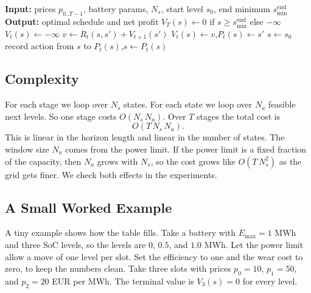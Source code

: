 \documentclass[conference,a4paper]{IEEEtran}
\begin{document}
\begin{algorithm}[t]
\caption{Battery arbitrage by dynamic programming}
\label{alg:dp}
\begin{algorithmic}[1]
\State \textbf{Input:} prices $p_{0..T-1}$, battery params, $N_s$,
start level $s_0$, end minimum $s_{\min}^{\text{end}}$
\State \textbf{Output:} optimal schedule and net profit
  \State $V_T(s) \gets 0$ if $s \ge s_{\min}^{\text{end}}$ else $-\infty$
\EndFor
{}
    \State $V_t(s) \gets -\infty$
      \State $v \gets R_t(s,s') + V_{t+1}(s')$
        \State $V_t(s) \gets v$,\quad $P_t(s) \gets s'$
      \EndIf
    \EndFor
  \EndFor
\EndFor
\State $s \gets s_0$
  \State record action from $s$ to $P_t(s)$,\quad $s \gets P_t(s)$
\EndFor
\end{algorithmic}
\end{algorithm}

\subsection{Complexity}
For each stage we loop over $N_s$ states. For each state we loop over $N_a$
feasible next levels. So one stage costs $O(N_s\,N_a)$. Over $T$ stages the
total cost is
\begin{equation}
O(T\,N_s\,N_a).
\end{equation}
This is linear in the horizon length and linear in the number of states. The
window size $N_a$ comes from the power limit. If the power limit is a fixed
fraction of the capacity, then $N_a$ grows with $N_s$, so the cost grows like
$O(T\,N_s^2)$ as the grid gets finer. We check both effects in the
experiments.

\subsection{A Small Worked Example}
A tiny example shows how the table fills. Take a battery with $E_{\max}=1$ MWh
and three SoC levels, so the levels are $0$, $0.5$, and $1.0$ MWh. Let the
power limit allow a move of one level per slot. Set the efficiency to one and
the wear cost to zero, to keep the numbers clean. Take three slots with prices
$p_0=10$, $p_1=50$, and $p_2=20$ EUR per MWh. The terminal value is
$V_3(s)=0$ for every level.
\end{document}

